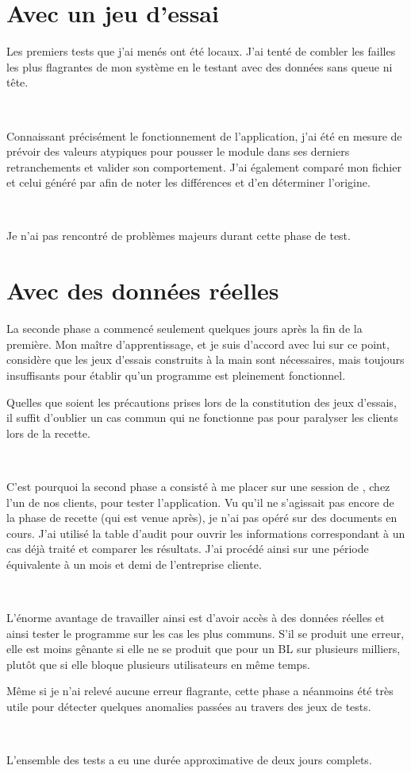 \section{Avec un jeu d'essai}
Les premiers tests que j'ai menés ont été locaux. J'ai tenté de combler les failles les plus flagrantes de mon système en le testant avec des données sans queue ni tête.

~

Connaissant précisément le fonctionnement de l'application, j'ai été en mesure de prévoir des valeurs atypiques pour pousser le module dans ses derniers retranchements et valider son comportement. J'ai également comparé mon fichier et celui généré par \pireus{} afin de noter les différences et d'en déterminer l'origine.

~

Je n'ai pas rencontré de problèmes majeurs durant cette phase de test.


\section{Avec des données réelles}
La seconde phase a commencé seulement quelques jours après la fin de la première. Mon maître d'apprentissage, et je suis d'accord avec lui sur ce point, considère que les jeux d'essais construits à la main sont nécessaires, mais toujours insuffisants pour établir qu'un programme est pleinement fonctionnel.

Quelles que soient les précautions prises lors de la constitution des jeux d'essais, il suffit d'oublier un cas commun qui ne fonctionne pas pour paralyser les clients lors de la recette.

~

C'est pourquoi la second phase a consisté à me placer sur une session de \solulog{}, chez l'un de nos clients, pour tester l'application. Vu qu'il ne s'agissait pas encore de la phase de recette (qui est venue après), je n'ai pas opéré sur des documents en cours. J'ai utilisé la table d'audit pour ouvrir les informations correspondant à un cas déjà traité et comparer les résultats. J'ai procédé ainsi sur une période équivalente à un mois et demi de l'entreprise cliente.

~

L'énorme avantage de travailler ainsi est d'avoir accès à des données réelles et ainsi tester le programme sur les cas les plus communs. S'il se produit une erreur, elle est moins gênante si elle ne se produit que pour un BL sur plusieurs milliers, plutôt que si elle bloque plusieurs utilisateurs en même temps.

Même si je n'ai relevé aucune erreur flagrante, cette phase a néanmoins été très utile pour détecter quelques anomalies passées au travers des jeux de tests.

~

L'ensemble des tests a eu une durée approximative de deux jours complets.